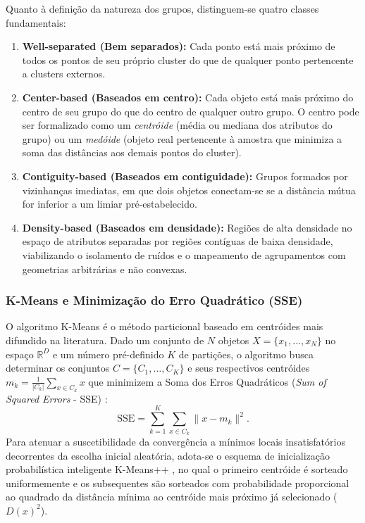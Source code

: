 Quanto à definição da natureza dos grupos, distinguem-se quatro classes fundamentais:
\begin{enumerate}
    \item \textbf{Well-separated (Bem separados):} Cada ponto está mais próximo de todos os pontos de seu próprio cluster do que de qualquer ponto pertencente a clusters externos.
    \item \textbf{Center-based (Baseados em centro):} Cada objeto está mais próximo do centro de seu grupo do que do centro de qualquer outro grupo. O centro pode ser formalizado como um \textit{centróide} (média ou mediana dos atributos do grupo) ou um \textit{medóide} (objeto real pertencente à amostra que minimiza a soma das distâncias aos demais pontos do cluster).
    \item \textbf{Contiguity-based (Baseados em contiguidade):} Grupos formados por vizinhanças imediatas, em que dois objetos conectam-se se a distância mútua for inferior a um limiar pré-estabelecido.
    \item \textbf{Density-based (Baseados em densidade):} Regiões de alta densidade no espaço de atributos separadas por regiões contíguas de baixa densidade, viabilizando o isolamento de ruídos e o mapeamento de agrupamentos com geometrias arbitrárias e não convexas.
\end{enumerate}

\subsubsection{K-Means e Minimização do Erro Quadrático (SSE)}

O algoritmo K-Means é o método particional baseado em centróides mais difundido na literatura. Dado um conjunto de $N$ objetos $X = \{x_1, \dots, x_N\}$ no espaço $\mathbb{R}^D$ e um número pré-definido $K$ de partições, o algoritmo busca determinar os conjuntos $C = \{C_1, \dots, C_K\}$ e seus respectivos centróides $m_k = \frac{1}{|C_k|} \sum_{x \in C_k} x$ que minimizem a Soma dos Erros Quadráticos (\textit{Sum of Squared Errors} - SSE) \cite{tan2019introduction}:
\begin{equation}
\mathrm{SSE} = \sum_{k=1}^K \sum_{x \in C_k} \|x - m_k\|^2.
\label{eq:sse}
\end{equation}
Para atenuar a suscetibilidade da convergência a mínimos locais insatisfatórios decorrentes da escolha inicial aleatória, adota-se o esquema de inicialização probabilística inteligente K-Means++ \cite{arthur2007k}, no qual o primeiro centróide é sorteado uniformemente e os subsequentes são sorteados com probabilidade proporcional ao quadrado da distância mínima ao centróide mais próximo já selecionado ($D(x)^2$).

